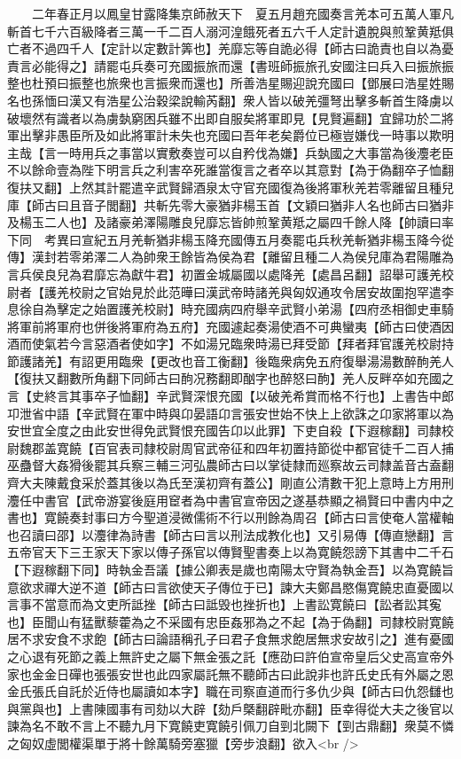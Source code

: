 　　二年春正月以鳳皇甘露降集京師赦天下　夏五月趙充國奏言羌本可五萬人軍凡斬首七千六百級降者三萬一千二百人溺河湟餓死者五六千人定計遺脫與煎鞏黄羝俱亡者不過四千人【定計以定數計筭也】羌靡忘等自詭必得【師古曰詭責也自以為憂責言必能得之】請罷屯兵奏可充國振旅而還【書班師振旅孔安國注曰兵入曰振旅振整也杜預曰振整也旅衆也言振衆而還也】所善浩星賜迎說充國曰【鄧展曰浩星姓賜名也孫愐曰漢又有浩星公治穀梁說輸芮翻】衆人皆以破羌彊弩出擊多斬首生降虜以破壞然有識者以為虜埶窮困兵雖不出即自服矣將軍即見【見賢遍翻】宜歸功於二將軍出擊非愚臣所及如此將軍計未失也充國曰吾年老矣爵位已極豈嫌伐一時事以欺明主哉【言一時用兵之事當以實敷奏豈可以自矜伐為嫌】兵埶國之大事當為後灋老臣不以餘命壹為陛下明言兵之利害卒死誰當復言之者卒以其意對【為于偽翻卒子恤翻復扶又翻】上然其計罷遣辛武賢歸酒泉太守官充國復為後將軍秋羌若零離留且種兒庫【師古曰且音子閭翻】共斬先零大豪猶非楊玉首【文穎曰猶非人名也師古曰猶非及楊玉二人也】及諸豪弟澤陽雕良兒靡忘皆帥煎鞏黄羝之屬四千餘人降【帥讀曰率下同　考異曰宣紀五月羌斬猶非楊玉降充國傳五月奏罷屯兵秋羌斬猶非楊玉降今從傳】漢封若零弟澤二人為帥衆王餘皆為侯為君【離留且種二人為侯兒庫為君陽雕為言兵侯良兒為君靡忘為獻牛君】初置金城屬國以處降羌【處昌呂翻】詔舉可護羌校尉者【護羌校尉之官始見於此范曄曰漢武帝時諸羌與匈奴通攻令居安故圍抱罕遣李息徐自為擊定之始置護羌校尉】時充國病四府舉辛武賢小弟湯【四府丞相御史車騎將軍前將軍府也併後將軍府為五府】充國遽起奏湯使酒不可典蠻夷【師古曰使酒因酒而使氣若今言惡酒者使如字】不如湯兄臨衆時湯已拜受節【拜者拜官護羌校尉持節護諸羌】有詔更用臨衆【更改也音工衡翻】後臨衆病免五府復舉湯湯數醉䣱羌人【復扶又翻數所角翻下同師古曰䣱况務翻即酗字也醉怒曰䣱】羌人反畔卒如充國之言【史終言其事卒子恤翻】辛武賢深恨充國【以破羌希賞而格不行也】上書告中郎卭泄省中語【辛武賢在軍中時與卬晏語卬言張安世始不快上上欲誅之卬家將軍以為安世宜全度之由此安世得免武賢恨充國告卬以此罪】下吏自殺【下遐稼翻】司隸校尉魏郡盖寛饒【百官表司隸校尉周官武帝征和四年初置持節從中都官徒千二百人捕巫蠱督大姦猾後罷其兵察三輔三河弘農師古曰以掌徒隸而廵察故云司隸盖音古盍翻齊大夫陳戴食采於蓋其後以為氏至漢初齊有蓋公】剛直公清數干犯上意時上方用刑灋任中書官【武帝游宴後庭用䆠者為中書官宣帝因之遂基恭顯之禍賢曰中書内中之書也】寛饒奏封事曰方今聖道浸微儒術不行以刑餘為周召【師古曰言使奄人當權軸也召讀曰邵】以灋律為詩書【師古曰言以刑法成教化也】又引易傳【傳直戀翻】言五帝官天下三王家天下家以傳子孫官以傳賢聖書奏上以為寛饒怨謗下其書中二千石【下遐稼翻下同】時執金吾議【據公卿表是歲也南陽太守賢為執金吾】以為寛饒旨意欲求禪大逆不道【師古曰言欲使天子傳位于已】諫大夫鄭昌愍傷寛饒忠直憂國以言事不當意而為文吏所詆挫【師古曰詆毁也挫折也】上書訟寛饒曰【訟者訟其寃也】臣聞山有猛獸藜藿為之不采國有忠臣姦邪為之不起【為于偽翻】司隸校尉寛饒居不求安食不求飽【師古曰論語稱孔子曰君子食無求飽居無求安故引之】進有憂國之心退有死節之義上無許史之屬下無金張之託【應劭曰許伯宣帝皇后父史高宣帝外家也金金日磾也張張安世也此四家屬託無不聽師古曰此說非也許氏史氏有外屬之恩金氏張氏自託於近侍也屬讀如本字】職在司察直道而行多仇少與【師古曰仇怨讎也與黨與也】上書陳國事有司劾以大辟【劾戶槩翻辟毗亦翻】臣幸得從大夫之後官以諫為名不敢不言上不聽九月下寛饒吏寛饒引佩刀自剄北闕下【剄古鼎翻】衆莫不憐之匈奴虛閭權渠單于將十餘萬騎旁塞獵【旁步浪翻】欲入<br />
